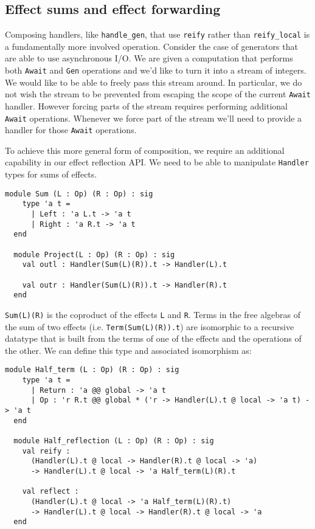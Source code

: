 \documentclass[acmsmall, screen, nonacm]{acmart}
\theoremstyle{definition}
\begin{document}
\subsection{Effect sums and effect forwarding}

Composing handlers, like \lstinline[style=oxcaml]{handle_gen}, that use
\lstinline[style=oxcaml]{reify} rather than
\lstinline[style=oxcaml]{reify_local} is a fundamentally more involved
operation. Consider the case of generators that are able to use
asynchronous I/O. We are given a computation that performs both
\lstinline[style=oxcaml]{Await} and \lstinline[style=oxcaml]{Gen}
operations and we'd like to turn it into a stream of integers.  We would
like to be able to freely pass this stream around. In particular, we do
not wish the stream to be prevented from escaping the scope of the
current \lstinline[style=oxcaml]{Await} handler.  However forcing parts
of the stream requires performing additional
\lstinline[style=oxcaml]{Await} operations. Whenever we force part of the
stream we'll need to provide a handler for those
\lstinline[style=oxcaml]{Await} operations.

To achieve this more general form of composition, we require an
additional capability in our effect reflection API. We need to be able
to manipulate \lstinline[style=oxcaml]{Handler} types for sums of
effects.
\begin{lstlisting}[style=oxcaml]
  module Sum (L : Op) (R : Op) : sig
    type 'a t =
      | Left : 'a L.t -> 'a t
      | Right : 'a R.t -> 'a t
  end

  module Project(L : Op) (R : Op) : sig
    val outl : Handler(Sum(L)(R)).t -> Handler(L).t

    val outr : Handler(Sum(L)(R)).t -> Handler(R).t
  end
\end{lstlisting}

\lstinline[style=oxcaml]{Sum(L)(R)} is the coproduct of the effects
\lstinline[style=oxcaml]{L} and \lstinline[style=oxcaml]{R}. Terms in
the free algebras of the sum of two effects
(i.e. \lstinline[style=oxcaml]{Term(Sum(L)(R)).t}) are isomorphic to a
recursive datatype that is built from the terms of one of the effects
and the operations of the other\cite{hyland2006combining}. We can define
this type and associated isomorphism as:
\begin{lstlisting}[style=oxcaml]
  module Half_term (L : Op) (R : Op) : sig
    type 'a t =
      | Return : 'a @@ global -> 'a t
      | Op : 'r R.t @@ global * ('r -> Handler(L).t @ local -> 'a t) -> 'a t
  end

  module Half_reflection (L : Op) (R : Op) : sig
    val reify :
      (Handler(L).t @ local -> Handler(R).t @ local -> 'a)
      -> Handler(L).t @ local -> 'a Half_term(L)(R).t

    val reflect :
      (Handler(L).t @ local -> 'a Half_term(L)(R).t)
      -> Handler(L).t @ local -> Handler(R).t @ local -> 'a
  end
\end{lstlisting}
\end{document}
